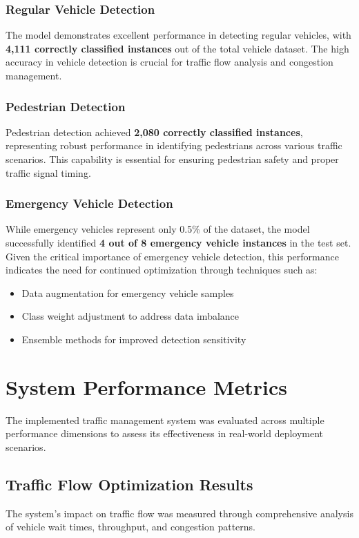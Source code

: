 \subsubsection{Regular Vehicle Detection}
The model demonstrates excellent performance in detecting regular vehicles, with \textbf{4,111 correctly classified instances} out of the total vehicle dataset. The high accuracy in vehicle detection is crucial for traffic flow analysis and congestion management.

\subsubsection{Pedestrian Detection}
Pedestrian detection achieved \textbf{2,080 correctly classified instances}, representing robust performance in identifying pedestrians across various traffic scenarios. This capability is essential for ensuring pedestrian safety and proper traffic signal timing.

\subsubsection{Emergency Vehicle Detection}
While emergency vehicles represent only 0.5\% of the dataset, the model successfully identified \textbf{4 out of 8 emergency vehicle instances} in the test set. Given the critical importance of emergency vehicle detection, this performance indicates the need for continued optimization through techniques such as:
\begin{itemize}
    \item Data augmentation for emergency vehicle samples
    \item Class weight adjustment to address data imbalance
    \item Ensemble methods for improved detection sensitivity
\end{itemize}

\section{System Performance Metrics}
\label{sec:system_performance}

The implemented traffic management system was evaluated across multiple performance dimensions to assess its effectiveness in real-world deployment scenarios.

\subsection{Traffic Flow Optimization Results}
The system's impact on traffic flow was measured through comprehensive analysis of vehicle wait times, throughput, and congestion patterns.

